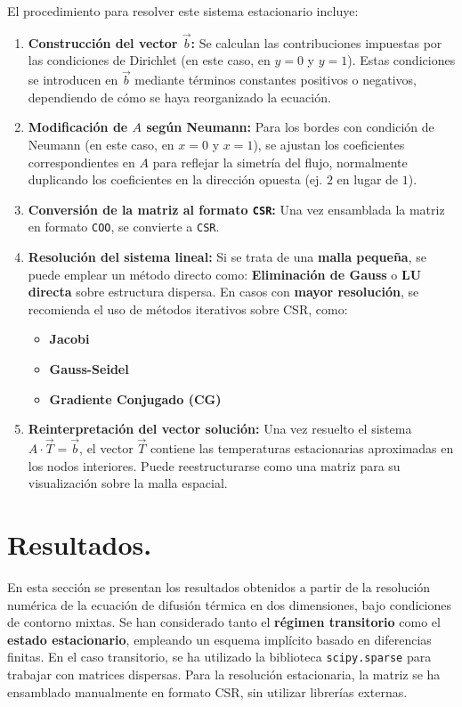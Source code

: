 \documentclass{article}
\begin{document}
\noindent El procedimiento para resolver este sistema estacionario incluye:

\begin{enumerate}
    \item \textbf{Construcción del vector $\vec{b}$:}  
    Se calculan las contribuciones impuestas por las condiciones de Dirichlet (en este caso, en $y = 0$ y $y = 1$). Estas condiciones se introducen en $\vec{b}$ mediante términos constantes positivos o negativos, dependiendo de cómo se haya reorganizado la ecuación.

    \item \textbf{Modificación de $A$ según Neumann:}  
    Para los bordes con condición de Neumann (en este caso, en $x = 0$ y $x = 1$), se ajustan los coeficientes correspondientes en $A$ para reflejar la simetría del flujo, normalmente duplicando los coeficientes en la dirección opuesta (ej. $2$ en lugar de $1$).

    \item \textbf{Conversión de la matriz al formato \texttt{CSR}:}  
    Una vez ensamblada la matriz en formato \texttt{COO}, se convierte a \texttt{CSR}.

    \item \textbf{Resolución del sistema lineal:}  
    Si se trata de una \textbf{malla pequeña}, se puede emplear un método directo como: \textbf{Eliminación de Gauss} o \textbf{LU directa} sobre estructura dispersa.
    En casos con \textbf{mayor resolución}, se recomienda el uso de métodos iterativos sobre CSR, como:
    \begin{itemize}
        \item \textbf{Jacobi}
        \item \textbf{Gauss-Seidel}
        \item \textbf{Gradiente Conjugado (CG)}
    \end{itemize}

    \item \textbf{Reinterpretación del vector solución:}  
    Una vez resuelto el sistema $A \cdot \vec{T} = \vec{b}$, el vector $\vec{T}$ contiene las temperaturas estacionarias aproximadas en los nodos interiores. Puede reestructurarse como una matriz para su visualización sobre la malla espacial.
\end{enumerate}


\newpage
\section{Resultados.}
En esta sección se presentan los resultados obtenidos a partir de la resolución numérica de la ecuación de difusión térmica en dos dimensiones, bajo condiciones de contorno mixtas. Se han considerado tanto el \textbf{régimen transitorio} como el \textbf{estado estacionario}, empleando un esquema implícito basado en diferencias finitas. En el caso transitorio, se ha utilizado la biblioteca \texttt{scipy.sparse} para trabajar con matrices dispersas. Para la resolución estacionaria, la matriz se ha ensamblado manualmente en formato CSR, sin utilizar librerías externas.\\
\end{document}
